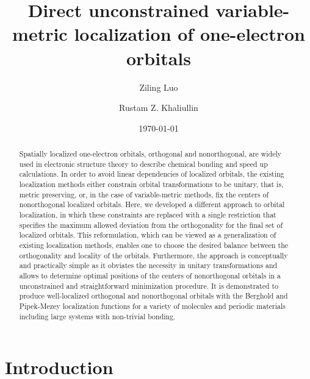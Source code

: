 \documentclass[aps,prl,reprint,amsmath,amssymb]{revtex4-1}
\begin{document}


\title{
Direct unconstrained variable-metric localization of one-electron orbitals
}

\author{Ziling Luo}
\author{Rustam Z. Khaliullin}

\date{\today}

\begin{abstract}
Spatially localized one-electron orbitals, orthogonal and nonorthogonal, are widely used in electronic structure theory to describe chemical bonding and speed up calculations. 
In order to avoid linear dependencies of localized orbitals, the existing localization methods either constrain orbital transformations to be unitary, that is, metric preserving, or, in the case of variable-metric methods, fix the centers of nonorthogonal localized orbitals. 
Here, we developed a different approach to orbital localization, in which these constraints are replaced with a single restriction that specifies the maximum allowed deviation from the orthogonality for the final set of localized orbitals. 
This reformulation, which can be viewed as a generalization of existing localization methods, enables one to choose the desired balance between the orthogonality and locality of the orbitals. 
Furthermore, the approach is conceptually and practically simple as it obviates the necessity in unitary transformations and allows to determine optimal positions of the centers of nonorthogonal orbitals in a unconstrained and straightforward minimization procedure. 
It is demonstrated to produce well-localized orthogonal and nonorthogonal orbitals with the Berghold and Pipek-Mezey localization functions for a variety of molecules and periodic materials including large systems with non-trivial bonding. 
\end{abstract}


\maketitle

\section{Introduction} 
\end{document}
